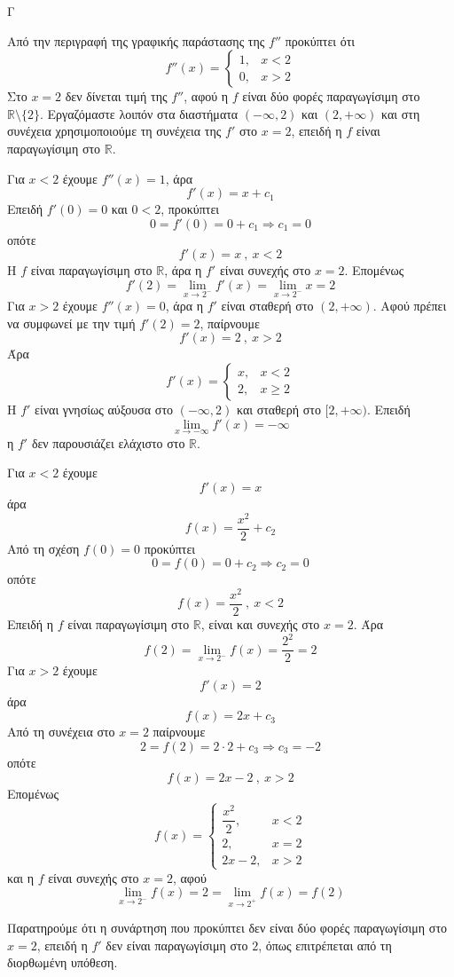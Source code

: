 \begin{thema}{Γ}
\begin{erwthma}
\item Από την περιγραφή της γραφικής παράστασης της $f''$ προκύπτει ότι
\[f''(x)=
\begin{cases}
1, & x<2\\
0, & x>2
\end{cases}\]
Στο $x=2$ δεν δίνεται τιμή της $f''$, αφού η $f$ είναι δύο φορές παραγωγίσιμη στο $\mathbb{R}\setminus\{2\}$.
Εργαζόμαστε λοιπόν στα διαστήματα $(-\infty,2)$ και $(2,+\infty)$ και στη συνέχεια χρησιμοποιούμε τη συνέχεια της $f'$ στο $x=2$, επειδή η $f$ είναι παραγωγίσιμη στο $\mathbb{R}$.

\item Για $x<2$ έχουμε $f''(x)=1$, άρα
\[f'(x)=x+c_1\]
Επειδή $f'(0)=0$ και $0<2$, προκύπτει
\[0=f'(0)=0+c_1\Rightarrow c_1=0\]
οπότε
\[f'(x)=x\ ,\ x<2\]
Η $f$ είναι παραγωγίσιμη στο $\mathbb{R}$, άρα η $f'$ είναι συνεχής στο $x=2$. Επομένως
\[f'(2)=\lim\limits_{x\to 2^-}f'(x)=\lim\limits_{x\to 2^-}x=2\]
Για $x>2$ έχουμε $f''(x)=0$, άρα η $f'$ είναι σταθερή στο $(2,+\infty)$. Αφού πρέπει να συμφωνεί με την τιμή $f'(2)=2$, παίρνουμε
\[f'(x)=2\ ,\ x>2\]
Άρα
\[f'(x)=
\begin{cases}
x, & x<2\\
2, & x\geq 2
\end{cases}\]
Η $f'$ είναι γνησίως αύξουσα στο $(-\infty,2)$ και σταθερή στο $[2,+\infty)$.
Επειδή
\[\lim\limits_{x\to-\infty}f'(x)=-\infty\]
η $f'$ δεν παρουσιάζει ελάχιστο στο $\mathbb{R}$.

\item Για $x<2$ έχουμε
\[f'(x)=x\]
άρα
\[f(x)=\frac{x^2}{2}+c_2\]
Από τη σχέση $f(0)=0$ προκύπτει
\[0=f(0)=0+c_2\Rightarrow c_2=0\]
οπότε
\[f(x)=\frac{x^2}{2}\ ,\ x<2\]
Επειδή η $f$ είναι παραγωγίσιμη στο $\mathbb{R}$, είναι και συνεχής στο $x=2$. Άρα
\[f(2)=\lim\limits_{x\to 2^-}f(x)=\frac{2^2}{2}=2\]
Για $x>2$ έχουμε
\[f'(x)=2\]
άρα
\[f(x)=2x+c_3\]
Από τη συνέχεια στο $x=2$ παίρνουμε
\[2=f(2)=2\cdot 2+c_3\Rightarrow c_3=-2\]
οπότε
\[f(x)=2x-2\ ,\ x>2\]
Επομένως
\[f(x)=
\begin{cases}
\dfrac{x^2}{2}, & x<2\\
2, & x=2\\
2x-2, & x>2
\end{cases}\]
και η $f$ είναι συνεχής στο $x=2$, αφού
\[\lim\limits_{x\to 2^-}f(x)=2=\lim\limits_{x\to 2^+}f(x)=f(2)\]

Παρατηρούμε ότι η συνάρτηση που προκύπτει δεν είναι δύο φορές παραγωγίσιμη στο $x=2$, επειδή η $f'$ δεν είναι παραγωγίσιμη στο $2$, όπως επιτρέπεται από τη διορθωμένη υπόθεση.


\end{erwthma}
\end{thema}

